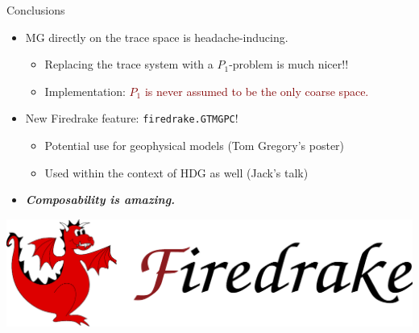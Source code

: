 \documentclass[9pt]{beamer}
\begin{document}
\begin{frame}[c]{Conclusions}
\begin{itemize}
	\item MG directly on the trace space is headache-inducing.
	\begin{itemize}
		\item Replacing the trace system with a $P_1$-problem is much nicer!!
		\item Implementation: \textcolor{maroon}{$P_1$ is never assumed to be the only coarse space.}
	\end{itemize}
	\item New Firedrake feature: \texttt{firedrake.GTMGPC}!
	\begin{itemize}
		\item Potential use for geophysical models (Tom Gregory's poster)
		\item Used within the context of HDG as well (Jack's talk)
	\end{itemize}
	\item \textbf{\emph{Composability is amazing.}}
\end{itemize}
\begin{center}
	\includegraphics[width=\linewidth]{firedrake-word}
\end{center}
\end{frame}
\end{document}
